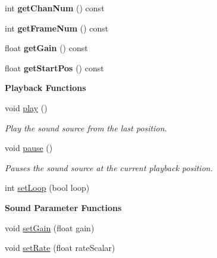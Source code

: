 \begin{DoxyCompactItemize}
\item 
\hypertarget{classsc_1_1Sound_af585b0b53046b31ce3b8e8fa896a8fa1}{int {\bfseries get\-Chan\-Num} () const }\label{classsc_1_1Sound_af585b0b53046b31ce3b8e8fa896a8fa1}

\item 
\hypertarget{classsc_1_1Sound_a67ba4a252dbac883db8a11916522cf44}{int {\bfseries get\-Frame\-Num} () const }\label{classsc_1_1Sound_a67ba4a252dbac883db8a11916522cf44}

\item 
\hypertarget{classsc_1_1Sound_ad20bfb300b292e9da5f1d97f5aa37fbe}{float {\bfseries get\-Gain} () const }\label{classsc_1_1Sound_ad20bfb300b292e9da5f1d97f5aa37fbe}

\item 
\hypertarget{classsc_1_1Sound_aeedf462dc8658dad1249f9b82d5d3469}{float {\bfseries get\-Start\-Pos} () const }\label{classsc_1_1Sound_aeedf462dc8658dad1249f9b82d5d3469}

\end{DoxyCompactItemize}
\begin{Indent}{\bf Playback Functions}\par
\begin{DoxyCompactItemize}
\item 
\hypertarget{classsc_1_1Sound_a491c7b5026a733fa09df9b3ce38b32ba}{void \hyperlink{classsc_1_1Sound_a491c7b5026a733fa09df9b3ce38b32ba}{play} ()}\label{classsc_1_1Sound_a491c7b5026a733fa09df9b3ce38b32ba}

\begin{DoxyCompactList}\small\item\em Play the sound source from the last position. \end{DoxyCompactList}\item 
\hypertarget{classsc_1_1Sound_a1faddaffeb6848690d6f8236095fe124}{void \hyperlink{classsc_1_1Sound_a1faddaffeb6848690d6f8236095fe124}{pause} ()}\label{classsc_1_1Sound_a1faddaffeb6848690d6f8236095fe124}

\begin{DoxyCompactList}\small\item\em Pauses the sound source at the current playback position. \end{DoxyCompactList}\item 
int \hyperlink{classsc_1_1Sound_a943faed99ce5d92f889aae1a908265c7}{set\-Loop} (bool loop)
\end{DoxyCompactItemize}
\end{Indent}
\begin{Indent}{\bf Sound Parameter Functions}\par
\begin{DoxyCompactItemize}
\item 
void \hyperlink{classsc_1_1Sound_a443df566abe97dcf23a879a971310d23}{set\-Gain} (float gain)
\item 
void \hyperlink{classsc_1_1Sound_a358d46a4cfd52b885bcb1cbd1715893c}{set\-Rate} (float rate\-Scalar)
\end{DoxyCompactItemize}
\end{Indent}


